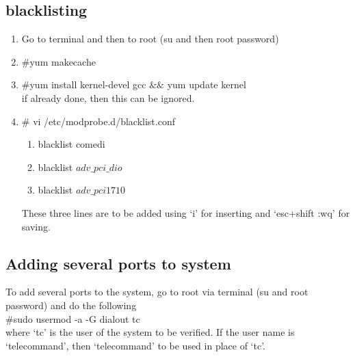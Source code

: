 \subsection{blacklisting}
	\begin{enumerate}
		\item [\textbullet] Go to terminal and then to root (su and then root password)
		\item [\textbullet] $\#$yum makecache
		\item [\textbullet] $\#$yum install kernel-devel gcc $\&$$\&$ yum update kernel\\
		if already done, then this can be ignored. 
		\item [\textbullet] $\#$ vi /etc/modprobe.d/blacklist.conf
		\begin{enumerate}
			\item blacklist comedi
			\item blacklist $adv\_pci\_dio$ 
			\item blacklist $adv\_pci1710$ 
		\end{enumerate}
	These three lines are to be added using `i' for inserting and `esc+shift :wq' for saving.
	\end{enumerate}
\subsection{Adding several ports to system}
To add several ports to the system, go to root via terminal (su and root password) and do the following\\
$\#$sudo usermod -a -G dialout tc\\
where `tc' is the user of the system to be verified. If the user name is `telecommand', then `telecommand' to be used in place of `tc'.
